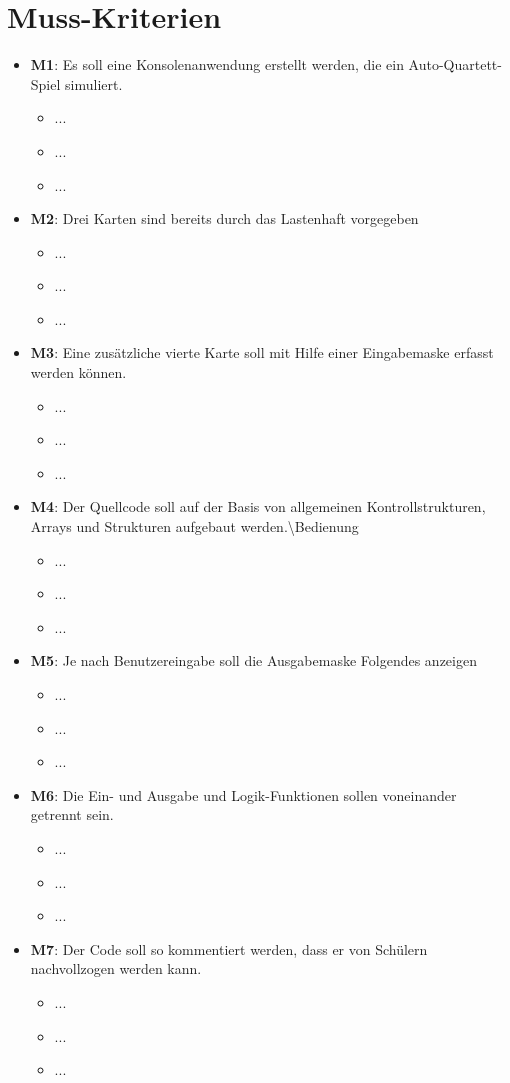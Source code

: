 \documentclass[11pt]{scrreprt}
\begin{document}
\section{Muss-Kriterien}
\begin{itemize}
\item \textbf{M1}: Es soll eine Konsolenanwendung erstellt werden, die ein Auto-Quartett-Spiel simuliert.
    \begin{itemize}
    \item ...
    \item ...
    \item ... 
    \end{itemize}
\item \textbf{M2}: Drei Karten sind bereits durch das Lastenhaft vorgegeben
    \begin{itemize}
    \item ...
    \item ...
    \item ... 
    \end{itemize}
\item \textbf{M3}: Eine zusätzliche vierte Karte soll mit Hilfe einer Eingabemaske erfasst werden können.
    \begin{itemize}
     \item ...
    \item ...
    \item ... 
    \end{itemize}
\item \textbf{M4}: Der Quellcode soll auf der Basis von allgemeinen Kontrollstrukturen, Arrays und Strukturen aufgebaut werden.\textbackslash Bedienung
    \begin{itemize}
    \item ...
    \item ...
    \item ... 
    \end{itemize}
\item \textbf{M5}: Je nach Benutzereingabe soll die Ausgabemaske Folgendes anzeigen
    \begin{itemize}
    \item ...
    \item ...
    \item ... 
    \end{itemize}
\item \textbf{M6}: Die Ein- und Ausgabe und Logik-Funktionen sollen voneinander getrennt sein.
    \begin{itemize}
    \item ...
    \item ...
    \item ... 
    \end{itemize}
\item \textbf{M7}: Der Code soll so kommentiert werden, dass er von Schülern nachvollzogen werden kann.
    \begin{itemize}
    \item ...
    \item ...
    \item ... 
    \end{itemize}
    
    
\end{itemize}
\end{document}

